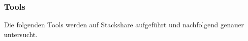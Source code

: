 \subsubsection{Tools}\label{iac_tools_tools}

Die folgenden Tools werden auf Stackshare aufgeführt und nachfolgend genauer untersucht.




%
